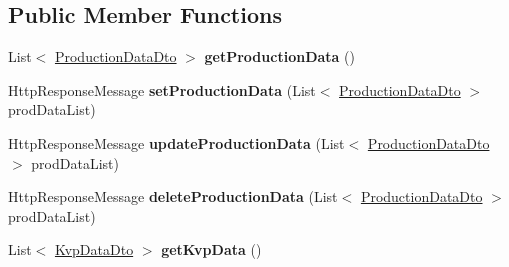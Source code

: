 \subsection*{Public Member Functions}
\begin{DoxyCompactItemize}
\item 
\mbox{\label{classkpi_mvc_api_1_1_controllers_1_1_kpidata_controller_a0ab15672f7d3b5a077a8c4b0612feab8}} 
List$<$ \hyperlink{classkpi_mvc_api_1_1_data_transfer_objects_1_1_production_data_dto}{Production\+Data\+Dto} $>$ {\bfseries get\+Production\+Data} ()
\item 
\mbox{\label{classkpi_mvc_api_1_1_controllers_1_1_kpidata_controller_a7f6c6c359f37a9b9a83d481b5c26a037}} 
Http\+Response\+Message {\bfseries set\+Production\+Data} (List$<$ \hyperlink{classkpi_mvc_api_1_1_data_transfer_objects_1_1_production_data_dto}{Production\+Data\+Dto} $>$ prod\+Data\+List)
\item 
\mbox{\label{classkpi_mvc_api_1_1_controllers_1_1_kpidata_controller_a82f308e9ae4809dfdca3ce685af05774}} 
Http\+Response\+Message {\bfseries update\+Production\+Data} (List$<$ \hyperlink{classkpi_mvc_api_1_1_data_transfer_objects_1_1_production_data_dto}{Production\+Data\+Dto} $>$ prod\+Data\+List)
\item 
\mbox{\label{classkpi_mvc_api_1_1_controllers_1_1_kpidata_controller_af1c1e99336a8408bbe4b637cfaaddc4b}} 
Http\+Response\+Message {\bfseries delete\+Production\+Data} (List$<$ \hyperlink{classkpi_mvc_api_1_1_data_transfer_objects_1_1_production_data_dto}{Production\+Data\+Dto} $>$ prod\+Data\+List)
\item 
\mbox{\label{classkpi_mvc_api_1_1_controllers_1_1_kpidata_controller_ae5b9cebd2043650b2fd60caa72e49da7}} 
List$<$ \hyperlink{classkpi_mvc_api_1_1_data_transfer_objects_1_1_kvp_data_dto}{Kvp\+Data\+Dto} $>$ {\bfseries get\+Kvp\+Data} ()
\item 
\mbox{\label{classkpi_mvc_api_1_1_controllers_1_1_kpidata_controller_aaed21921287f9a780cc3ff7e1042dc2a}} 

\end{DoxyCompactItemize}
